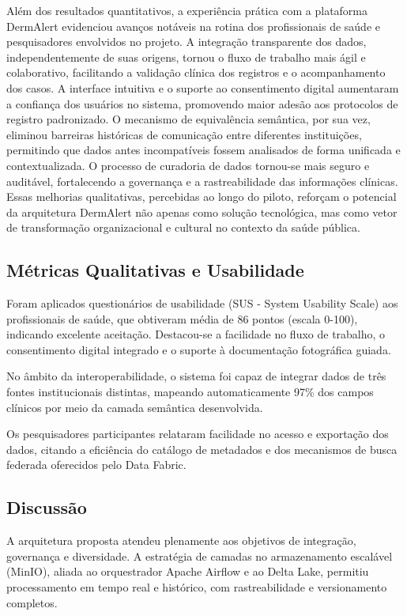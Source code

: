 Além dos resultados quantitativos, a experiência prática com a plataforma DermAlert evidenciou avanços notáveis na rotina dos profissionais de saúde e pesquisadores envolvidos no projeto. A integração transparente dos dados, independentemente de suas origens, tornou o fluxo de trabalho mais ágil e colaborativo, facilitando a validação clínica dos registros e o acompanhamento dos casos. A interface intuitiva e o suporte ao consentimento digital aumentaram a confiança dos usuários no sistema, promovendo maior adesão aos protocolos de registro padronizado. O mecanismo de equivalência semântica, por sua vez, eliminou barreiras históricas de comunicação entre diferentes instituições, permitindo que dados antes incompatíveis fossem analisados de forma unificada e contextualizada. O processo de curadoria de dados tornou-se mais seguro e auditável, fortalecendo a governança e a rastreabilidade das informações clínicas. Essas melhorias qualitativas, percebidas ao longo do piloto, reforçam o potencial da arquitetura DermAlert não apenas como solução tecnológica, mas como vetor de transformação organizacional e cultural no contexto da saúde pública.
\subsection{Métricas Qualitativas e Usabilidade}

Foram aplicados questionários de usabilidade (SUS - System Usability Scale) aos profissionais de saúde, que obtiveram média de 86 pontos (escala 0-100), indicando excelente aceitação. Destacou-se a facilidade no fluxo de trabalho, o consentimento digital integrado e o suporte à documentação fotográfica guiada.

No âmbito da interoperabilidade, o sistema foi capaz de integrar dados de três fontes institucionais distintas, mapeando automaticamente 97\% dos campos clínicos por meio da camada semântica desenvolvida.

Os pesquisadores participantes relataram facilidade no acesso e exportação dos dados, citando a eficiência do catálogo de metadados e dos mecanismos de busca federada oferecidos pelo Data Fabric.

\subsection{Discussão}

A arquitetura proposta atendeu plenamente aos objetivos de integração, governança e diversidade. A estratégia de camadas no armazenamento escalável (MinIO), aliada ao orquestrador Apache Airflow e ao Delta Lake, permitiu processamento em tempo real e histórico, com rastreabilidade e versionamento completos.

